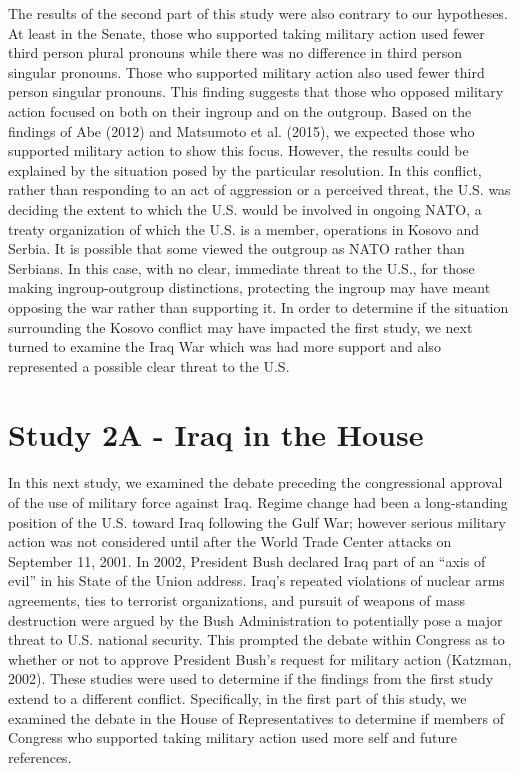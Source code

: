 \documentclass[english,man]{apa6}
\theoremstyle{definition}
\theoremstyle{definition}
\theoremstyle{definition}
\theoremstyle{remark}
\begin{document}
The results of the second part of this study were also contrary to our
hypotheses. At least in the Senate, those who supported taking military
action used fewer third person plural pronouns while there was no
difference in third person singular pronouns. Those who supported
military action also used fewer third person singular pronouns. This
finding suggests that those who opposed military action focused on both
on their ingroup and on the outgroup. Based on the findings of Abe
(2012) and Matsumoto et al. (2015), we expected those who supported
military action to show this focus. However, the results could be
explained by the situation posed by the particular resolution. In this
conflict, rather than responding to an act of aggression or a perceived
threat, the U.S. was deciding the extent to which the U.S. would be
involved in ongoing NATO, a treaty organization of which the U.S. is a
member, operations in Kosovo and Serbia. It is possible that some viewed
the outgroup as NATO rather than Serbians. In this case, with no clear,
immediate threat to the U.S., for those making ingroup-outgroup
distinctions, protecting the ingroup may have meant opposing the war
rather than supporting it. In order to determine if the situation
surrounding the Kosovo conflict may have impacted the first study, we
next turned to examine the Iraq War which was had more support and also
represented a possible clear threat to the U.S.

\section{Study 2A - Iraq in the
House}\label{study-2a---iraq-in-the-house}

In this next study, we examined the debate preceding the congressional
approval of the use of military force against Iraq. Regime change had
been a long-standing position of the U.S. toward Iraq following the Gulf
War; however serious military action was not considered until after the
World Trade Center attacks on September 11, 2001. In 2002, President
Bush declared Iraq part of an \enquote{axis of evil} in his State of the
Union address. Iraq's repeated violations of nuclear arms agreements,
ties to terrorist organizations, and pursuit of weapons of mass
destruction were argued by the Bush Administration to potentially pose a
major threat to U.S. national security. This prompted the debate within
Congress as to whether or not to approve President Bush's request for
military action (Katzman, 2002). These studies were used to determine if
the findings from the first study extend to a different conflict.
Specifically, in the first part of this study, we examined the debate in
the House of Representatives to determine if members of Congress who
supported taking military action used more self and future references.
\end{document}
